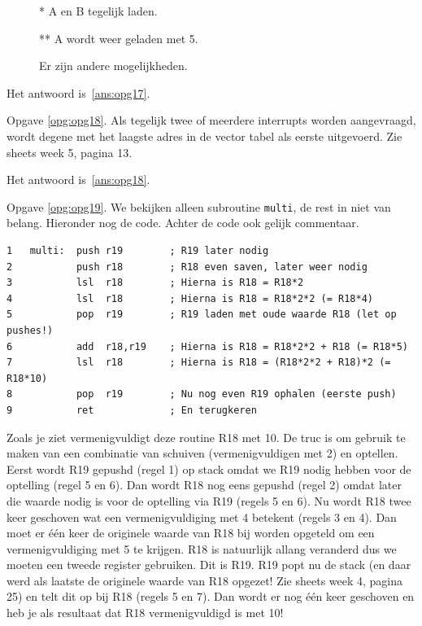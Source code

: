 \documentclass[a4paper,12pt,fleqn,dutch]{tisdexam}
\begin{document}
\begin{questions}
\begin{figure}[H]
\begin{minipage}[!t]{.350\linewidth}
    * A en B tegelijk laden.
    
    ** A wordt weer geladen met 5.
    
    Er zijn andere mogelijkheden.
    \vskip10pt
  \end{minipage}\hfill
\end{figure}

Het antwoord is~\ref{ans:opg17}.

\vspace{1em}
Opgave \ref{opg:opg18}. Als tegelijk twee of meerdere interrupts worden aangevraagd,
wordt degene met het laagste adres in de vector tabel als eerste uitgevoerd.
Zie sheets week 5, pagina 13. 

Het antwoord is~\ref{ans:opg18}.

\vspace{1em}
Opgave \ref{opg:opg19}. We bekijken alleen subroutine \texttt{multi}, de rest in niet
van belang. Hieronder nog de code. Achter de code ook gelijk commentaar.
\begin{verbatim}
1   multi:  push r19        ; R19 later nodig
2           push r18        ; R18 even saven, later weer nodig
3           lsl  r18        ; Hierna is R18 = R18*2
4           lsl	 r18        ; Hierna is R18 = R18*2*2 (= R18*4)
5           pop	 r19        ; R19 laden met oude waarde R18 (let op pushes!)
6           add	 r18,r19    ; Hierna is R18 = R18*2*2 + R18 (= R18*5)
7           lsl	 r18        ; Hierna is R18 = (R18*2*2 + R18)*2 (= R18*10)
8           pop	 r19        ; Nu nog even R19 ophalen (eerste push)
9           ret             ; En terugkeren
\end{verbatim}

Zoals je ziet vermenigvuldigt deze routine R18 met 10. De truc is om gebruik
te maken van een combinatie van schuiven (vermenigvuldigen met 2) en optellen.
Eerst wordt R19 gepushd (regel 1) op stack omdat we R19 nodig hebben voor de
optelling (regel 5 en 6). Dan wordt R18 nog eens gepushd (regel 2) omdat later
die waarde nodig is voor de optelling via R19 (regels 5 en 6). Nu wordt R18
twee keer geschoven wat een vermenigvuldiging met 4 betekent (regels 3 en 4).
Dan moet er \'{e}\'{e}n keer de originele waarde van R18 bij worden opgeteld
om een vermenigvuldiging met 5 te krijgen. R18 is natuurlijk allang veranderd
dus we moeten een tweede register gebruiken. Dit is R19. R19 popt nu de stack
(en daar werd als laatste de originele waarde van R18 opgezet! Zie sheets week
4, pagina 25) en telt dit op bij R18 (regels 5 en 7). Dan wordt er nog
\'{e}\'{e}n keer geschoven en heb je als resultaat dat R18 vermenigvuldigd is
met 10!


\end{questions}
\end{document}
